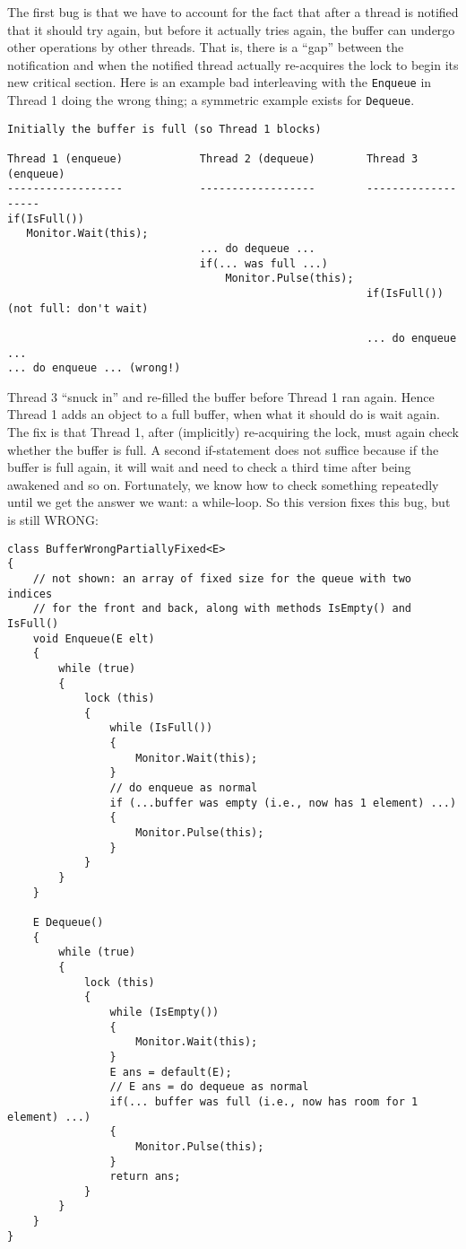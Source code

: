 \documentclass[10pt]{article}
\begin{document}
The first bug is that we have to account for the fact that after a
thread is notified that it should try again, but before it actually
tries again, the buffer can undergo other operations by other
threads.  That is, there is a ``gap'' between the notification and
when the notified thread actually re-acquires the lock to begin its
new critical section.  Here is an example bad interleaving with the
{\tt Enqueue} in Thread 1 doing the wrong thing; a symmetric example
exists for {\tt Dequeue}.
\goodbreak
\begin{verbatim}
Initially the buffer is full (so Thread 1 blocks)

Thread 1 (enqueue)            Thread 2 (dequeue)        Thread 3 (enqueue)
------------------            ------------------        -------------------
if(IsFull())
   Monitor.Wait(this);
                              ... do dequeue ...
                              if(... was full ...)
                                  Monitor.Pulse(this);
                                                        if(IsFull()) (not full: don't wait)
 
                                                        ... do enqueue ...           
... do enqueue ... (wrong!)
\end{verbatim}
Thread 3 ``snuck in'' and re-filled the buffer before Thread 1 ran again.
Hence Thread 1 adds an object to a full buffer, when what it should do
is wait again.  The fix is that Thread 1, after (implicitly)
re-acquiring the lock, must again check whether the buffer is full.  A
second if-statement does not suffice because if the buffer is full
again, it will wait and need to check a third time after being awakened
and so on.  Fortunately, we know how to check something repeatedly
until we get the answer we want: a while-loop.  So this version fixes
this bug, but is still WRONG:
\begin{verbatim}
class BufferWrongPartiallyFixed<E>
{
    // not shown: an array of fixed size for the queue with two indices
    // for the front and back, along with methods IsEmpty() and IsFull()
    void Enqueue(E elt)
    {
        while (true)
        {
            lock (this)
            {
                while (IsFull())
                {
                    Monitor.Wait(this);
                }
                // do enqueue as normal
                if (...buffer was empty (i.e., now has 1 element) ...)
                {
                    Monitor.Pulse(this);
                }
            }
        }
    }

    E Dequeue()
    {
        while (true)
        {
            lock (this)
            {
                while (IsEmpty())
                {
                    Monitor.Wait(this);
                }
                E ans = default(E);
                // E ans = do dequeue as normal
                if(... buffer was full (i.e., now has room for 1 element) ...)
                {
                    Monitor.Pulse(this);
                }
                return ans;
            }
        }
    }
}
\end{verbatim}
\end{document}
